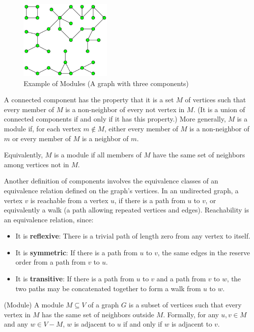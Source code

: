 \begin{figure}[!h]
    \centering
    \includegraphics[width=0.40\textwidth]{images/graphs/Pseudoforest}
    \caption{Example of Modules (A graph with three components) \cite{componentwikipedia}}
    \label{fig:example-modules}
\end{figure}

A connected component has the property that it is a set $M$ of vertices such that every member of $M$ is a non-neighbor of every not vertex in $M$.
(It is a union of connected components if and only if it has this property.)
More generally, $M$ is a module if, for each vertex $m \notin M$, either every member of $M$ is a non-neighbor of $m$ or every member of $M$ is a neighbor of $m$.

Equivalently, $M$ is a module if all members of $M$ have the same set of neighbors among vertices not in $M$.

Another definition of components involves the equivalence classes of an equivalence relation defined on the graph's vertices.
In an undirected graph, a vertex $v$ is reachable from a vertex $u$, if there is a path from $u$ to $v$, or equivalently a walk (a path allowing repeated vertices and edges).
Reachability is an equivalence relation, since:
\begin{itemize}
    \item It is \textbf{reflexive}: There is a trivial path of length zero from any vertex to itself.
    \item It is \textbf{symmetric}: If there is a path from $u$ to $v$, the same edges in the reserve order from a path from $v$ to $u$.
    \item It is \textbf{transitive}: If there is a path from $u$ to $v$ and a path from $v$ to $w$, the two paths may be concatenated together to form a walk from $u$ to $w$.
\end{itemize}

\begin{mydef}
(Module)
    A module $M \subseteq V$ of a graph $G$ is a subset of vertices such that every vertex in $M$ has the same set of neighbors outside $M$.
    Formally, for any $u, v \in M$ and any $w \in V - M$, $w$ is adjacent to $u$ if and only if $w$ is adjacent to $v$.
\end{mydef}

